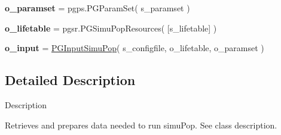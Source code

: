 \begin{DoxyCompactItemize}
\item 
{\bfseries o\+\_\+paramset} = pgps.\+P\+G\+Param\+Set( s\+\_\+paramset )\hypertarget{namespacenegui_1_1pginputsimupop_ac0b61e7e37d60e3975dabaab3bd3860a}{}\label{namespacenegui_1_1pginputsimupop_ac0b61e7e37d60e3975dabaab3bd3860a}

\item 
{\bfseries o\+\_\+lifetable} = pgsr.\+P\+G\+Simu\+Pop\+Resources( \mbox{[}s\+\_\+lifetable\mbox{]} )\hypertarget{namespacenegui_1_1pginputsimupop_a29862789f653e600c71f7e493da85fe6}{}\label{namespacenegui_1_1pginputsimupop_a29862789f653e600c71f7e493da85fe6}

\item 
{\bfseries o\+\_\+input} = \hyperlink{classnegui_1_1pginputsimupop_1_1PGInputSimuPop}{P\+G\+Input\+Simu\+Pop}( s\+\_\+configfile, o\+\_\+lifetable, o\+\_\+paramset )\hypertarget{namespacenegui_1_1pginputsimupop_ab1875160da07b1636155bb3793562c2d}{}\label{namespacenegui_1_1pginputsimupop_ab1875160da07b1636155bb3793562c2d}

\end{DoxyCompactItemize}


\subsection{Detailed Description}
\begin{DoxyVerb}Description

Retrieves and prepares data needed to run simuPop.  See class description.\end{DoxyVerb}
 